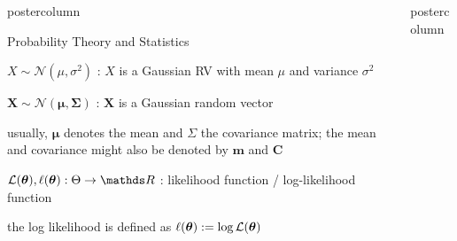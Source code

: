 \documentclass[11pt,compress,t,notes=noshow, xcolor=table]{beamer}
\newlength{\columnheight} %
\begin{document}
\begin{frame}[fragile]{}
\begin{columns}
\begin{column}{.31\textwidth}
\begin{beamercolorbox}[center]{postercolumn}
\begin{minipage}{.98\textwidth}
{\begin{myblock}{Probability Theory and Statistics}
						\begin{codebox}
							 $X \sim \mathcal{N}(\mu, \sigma^2)$ : $X$ is a Gaussian RV with mean $\mu$ and variance $\sigma^2$
						\end{codebox}
						\hspace*{1ex}
						\begin{codebox}
							 $\bm{X} \sim \mathcal{N}(\bm{\mu}, \bm{\Sigma})$ : $\bm{X}$ is a Gaussian random vector
						\end{codebox}
						\hspace*{1ex} usually, $\bm{\mu}$ denotes the mean and $\Sigma$ the covariance matrix; the mean and covariance might also be denoted by $\bm{m}$ and $\bm{C}$\\
						\begin{codebox}
							 $\mathcal{L}(\thetab), \ell(\thetab): \Theta \to \R$ : likelihood function / log-likelihood function
						\end{codebox}
						\hspace*{1ex} the log likelihood is defined as $\ell(\bm{\theta}) := \log \mathcal{L}(\bm{\theta})$		

					\end{myblock}					
					\vfill
					}
			\end{minipage}
		\end{beamercolorbox}
	\end{column}
	\begin{column}{.31\textwidth}
		\begin{beamercolorbox}[center]{postercolumn}
			\begin{minipage}{.98\textwidth}
				\parbox[t][\columnheight]{\textwidth}{
		
}
\end{minipage}
\end{beamercolorbox}
\end{column}
\end{columns}
\end{frame}
\end{document}
